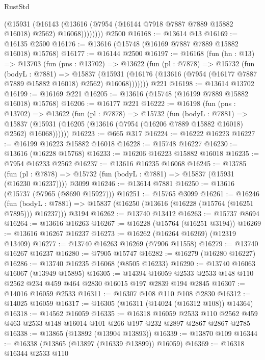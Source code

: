 \begin{lexlean}{RustStd}
\begin{coremodule}
              (@15931
                (@16143
                  (@13616 (@7954 (@16144 @7918 @7887 @7889 @15882 @16018) @2562) @16068))))))))
    @2500
@16168 := @13614 @13
@16169 := @16135 @2500
@16176 := @13616 (@15748 (@16169 @7887 @7889 @15882 @16018) @15768)
@16177 := @16144 @2500
@16197 := @16168
    (fun (hn : @13) =>
    @13703
      (fun (pns : @13702) =>
      @13622
        (fun (pl : @7878) =>
        @15732
          (fun (bodyL : @7881) =>
          @15837
            (@15931 (@16176 (@13616 (@7954 (@16177 @7887 @7889 @15882 @16018) @2562) @16068)))))))
    @221
@16198 := @13614 @13702
@16199 := @16169 @221
@16205 := @13616 (@15748 (@16199 @7889 @15882 @16018) @15768)
@16206 := @16177 @221
@16222 := @16198
    (fun (pns : @13702) =>
    @13622
      (fun (pl : @7878) =>
      @15732
        (fun (bodyL : @7881) =>
        @15837 (@15931 (@16205 (@13616 (@7954 (@16206 @7889 @15882 @16018) @2562) @16068))))))
@16223 := @665 @317
@16224 := @16222 @16223
@16227 := @16199 @16223 @15882 @16018
@16228 := @15748 @16227
@16230 := @13616 (@16228 @15768)
@16233 := @16206 @16223 @15882 @16018
@16235 := @7954 @16233 @2562
@16237 := @13616 @16235 @16068
@16245 := @13785
    (fun (pl : @7878) => @15732 (fun (bodyL : @7881) => @15837 (@15931 (@16230 @16237))))
    @3099
@16246 := @13614 @7881
@16250 := @13616 (@15737 (@7965 (@8690 @15927)))
@16251 := @15765 @3099
@16261 := @16246
    (fun (bodyL : @7881) => @15837 (@16250 (@13616 (@16228 (@15764 (@16251 @7895))) @16237)))
    @3194
@16262 := @13740 @13412
@16263 := @15737 @8694
@16264 := @13616 @16263
@16267 := @16228 (@15764 (@16251 @3194))
@16269 := @13616 @16267 @16237
@16273 := @16262 (@16264 @16269) (@12319 @13409)
@16277 := @13740 @16263 @16269 (@7906 @11558)
@16279 := @13740 @16267 @16237
@16280 := @7905 @15747
@16282 := @16279 (@16280 @16227)
@16286 := @13740 @16235 @16068 (@8505 @16233)
@16290 := @13740 @16063 @16067 (@13949 @15895)
@16305 := @14394
    @16059
    @2533
    @2533
    @148
    @110
    @2562
    @234
    @459
    @464
    @2830
    @16015
    @197
    @2839
    @194
    @2845
@16307 := @14016 @16059 @2533
@16311 := @16307 @108 @110 @108 @2830
@16312 := @14025 @16059
@16317 := @16305 (@16311 (@14024 (@16312 @108)) @14364)
@16318 := @14562 @16059
@16335 := @16318
    @16059
    @2533
    @110
    @2562
    @459
    @463
    @2533
    @148
    @16014
    @101
    @266
    @197
    @232
    @2897
    @2867
    @2867
    @2785
@16338 := @13865 (@13892 (@13904 @13893))
@16339 := @13870 @109
@16344 := @16338 (@13865 (@13897 (@16339 @13899)) @16059)
@16369 := @16318
    @16344
    @2533
    @110

\end{coremodule}
\end{lexlean}
